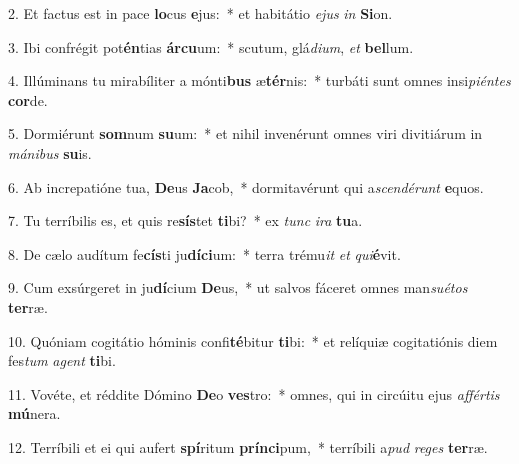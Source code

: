 2. Et factus est in pace \textbf{lo}cus \textbf{e}jus:~*  et habitátio \textit{e}\textit{jus} \textit{in} \textbf{Si}on.\

3. Ibi confrégit pot\textbf{én}tias \textbf{ár}\textbf{cu}um:~*  scutum, glá\textit{di}\textit{um}, \textit{et} \textbf{bel}lum.\

4. Illúminans tu mirabíliter a mónti\textbf{bus} æ\textbf{tér}nis:~*  turbáti sunt omnes insi\textit{pi}\textit{én}\textit{tes} \textbf{cor}de.\

5. Dormiérunt \textbf{som}num \textbf{su}um:~*  et nihil invenérunt omnes viri divitiárum in \textit{má}\textit{ni}\textit{bus} \textbf{su}is.\

6. Ab increpatióne tua, \textbf{De}us \textbf{Ja}cob,~*  dormitavérunt qui a\textit{scen}\textit{dé}\textit{runt} \textbf{e}quos.\

7. Tu terríbilis es, et quis re\textbf{sís}tet \textbf{ti}bi?~*  ex \textit{tunc} \textit{i}\textit{ra} \textbf{tu}a.\

8. De cælo audítum fe\textbf{cís}ti ju\textbf{dí}\textbf{ci}um:~*  terra trému\textit{it} \textit{et} \textit{qui}\textbf{é}vit.\

9. Cum exsúrgeret in ju\textbf{dí}cium \textbf{De}us,~*  ut salvos fáceret omnes man\textit{su}\textit{é}\textit{tos} \textbf{ter}ræ.\

10. Quóniam cogitátio hóminis confi\textbf{té}bitur \textbf{ti}bi:~*  et relíquiæ cogitatiónis diem fes\textit{tum} \textit{a}\textit{gent} \textbf{ti}bi.\

11. Vovéte, et réddite Dómino \textbf{De}o \textbf{ves}tro:~*  omnes, qui in circúitu ejus \textit{af}\textit{fér}\textit{tis} \textbf{mú}nera.\

12. Terríbili et ei qui aufert \textbf{spí}ritum \textbf{prín}\textbf{ci}pum,~*  terríbili a\textit{pud} \textit{re}\textit{ges} \textbf{ter}ræ.\

